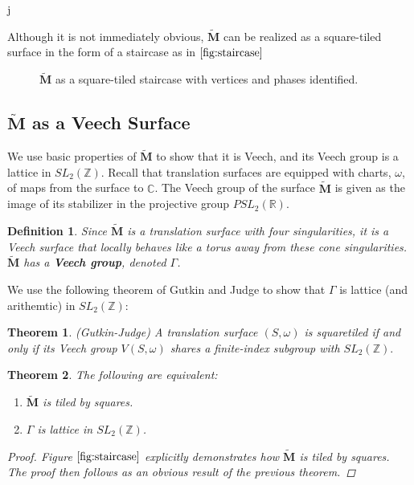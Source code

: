 j\documentclass[]{article}
\newtheorem{thm}{Theorem}[subsection]
\newtheorem{Def}{Definition}[subsection]
\begin{document}
Although it is not immediately obvious, $\tilde{\mathbf{M}}$ can be realized as a square-tiled surface in the form of a staircase as in $\ref{fig:staircase}$


\begin{figure}[H]
\centering

\caption{$\tilde{\mathbf{M}}$ as a square-tiled staircase with vertices and phases identified.}
\label{fig:staircase}
\end{figure}

\subsection{$\tilde{\mathbf{M}}$ as a Veech Surface}
We use basic properties of $\tilde{\mathbf{M}}$ to show that it is Veech, and its Veech group is a lattice in $SL_2(\mathbb{Z})$. Recall that translation surfaces are equipped with charts, $\omega$, of maps from the surface to $\mathbb{C}$. The Veech group of the surface $\tilde{\mathbf{M}}$ is given as the image of its stabilizer in the projective group $PSL_2(\mathbb{R})$.

\begin{Def}
Since $\tilde{\mathbf{M}}$ is a translation surface with four singularities, it is a Veech surface that locally behaves like a torus away from these cone singularities. $\tilde{\mathbf{M}}$ has a \textbf{Veech group}, denoted $\Gamma$.
\end{Def}

We use the following theorem of Gutkin and Judge to show that $\Gamma$ is lattice (and arithemtic) in $SL_2(\mathbb{Z})$:

\begin{thm}(Gutkin-Judge) A translation surface $(S,\omega)$ is squaretiled
if and only if its Veech group $V(S,\omega)$ shares a finite-index subgroup
with $SL_2(\mathbb{Z}).$
\end{thm}

\begin{thm}The following are equivalent:
\begin{enumerate}[label=(\roman*)]
\item $\tilde{\mathbf{M}}$ is tiled by squares.
\item $\Gamma$ is lattice in $SL_2(\mathbb{Z})$.
\end{enumerate}
\begin{proof}
Figure $\ref{fig:staircase}$ explicitly demonstrates how $\tilde{\mathbf{M}}$ is tiled by squares. The proof then follows as an obvious result of the previous theorem.
\end{proof}
\end{thm}
\end{document}
